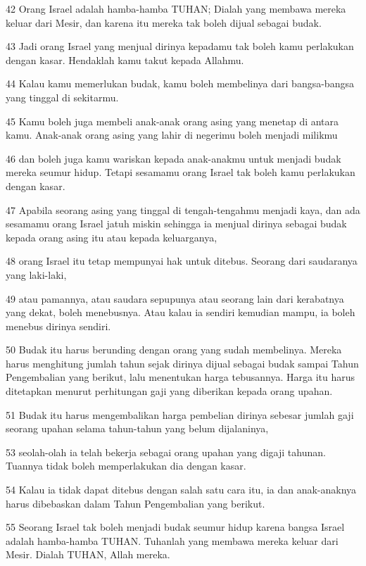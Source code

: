 \par 42 Orang Israel adalah hamba-hamba TUHAN; Dialah yang membawa mereka keluar dari Mesir, dan karena itu mereka tak boleh dijual sebagai budak.
\par 43 Jadi orang Israel yang menjual dirinya kepadamu tak boleh kamu perlakukan dengan kasar. Hendaklah kamu takut kepada Allahmu.
\par 44 Kalau kamu memerlukan budak, kamu boleh membelinya dari bangsa-bangsa yang tinggal di sekitarmu.
\par 45 Kamu boleh juga membeli anak-anak orang asing yang menetap di antara kamu. Anak-anak orang asing yang lahir di negerimu boleh menjadi milikmu
\par 46 dan boleh juga kamu wariskan kepada anak-anakmu untuk menjadi budak mereka seumur hidup. Tetapi sesamamu orang Israel tak boleh kamu perlakukan dengan kasar.
\par 47 Apabila seorang asing yang tinggal di tengah-tengahmu menjadi kaya, dan ada sesamamu orang Israel jatuh miskin sehingga ia menjual dirinya sebagai budak kepada orang asing itu atau kepada keluarganya,
\par 48 orang Israel itu tetap mempunyai hak untuk ditebus. Seorang dari saudaranya yang laki-laki,
\par 49 atau pamannya, atau saudara sepupunya atau seorang lain dari kerabatnya yang dekat, boleh menebusnya. Atau kalau ia sendiri kemudian mampu, ia boleh menebus dirinya sendiri.
\par 50 Budak itu harus berunding dengan orang yang sudah membelinya. Mereka harus menghitung jumlah tahun sejak dirinya dijual sebagai budak sampai Tahun Pengembalian yang berikut, lalu menentukan harga tebusannya. Harga itu harus ditetapkan menurut perhitungan gaji yang diberikan kepada orang upahan.
\par 51 Budak itu harus mengembalikan harga pembelian dirinya sebesar jumlah gaji seorang upahan selama tahun-tahun yang belum dijalaninya,
\par 53 seolah-olah ia telah bekerja sebagai orang upahan yang digaji tahunan. Tuannya tidak boleh memperlakukan dia dengan kasar.
\par 54 Kalau ia tidak dapat ditebus dengan salah satu cara itu, ia dan anak-anaknya harus dibebaskan dalam Tahun Pengembalian yang berikut.
\par 55 Seorang Israel tak boleh menjadi budak seumur hidup karena bangsa Israel adalah hamba-hamba TUHAN. Tuhanlah yang membawa mereka keluar dari Mesir. Dialah TUHAN, Allah mereka.

